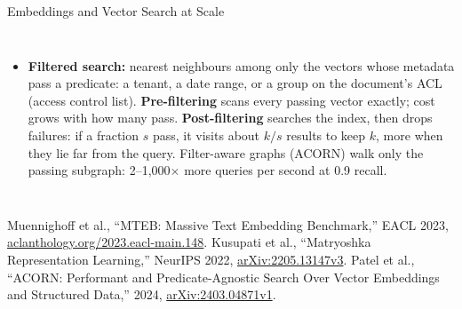 \begin{frame}{Embeddings and Vector Search at Scale}
\begin{columns}[T,onlytextwidth]
      \begin{itemize}\scriptsize
        \item[\textcolor{red}{$\blacktriangleright$}] \textbf{Filtered search:} nearest neighbours among only the vectors whose metadata pass a predicate: a tenant, a date range, or a group on the document's ACL (access control list). \textbf{Pre-filtering} scans every passing vector exactly; cost grows with how many pass. \textbf{Post-filtering} searches the index, then drops failures: if a fraction $s$ pass, it visits about $k/s$ results to keep $k$, more when they lie far from the query. Filter-aware graphs (ACORN) walk only the passing subgraph: 2--1{,}000$\times$ more queries per second at 0.9 recall.
      \end{itemize}
  \end{columns}
  \vspace{0.1em}
  {\scriptsize Muennighoff et al., ``MTEB: Massive Text Embedding Benchmark,'' EACL 2023, \href{https://aclanthology.org/2023.eacl-main.148/}{aclanthology.org/2023.eacl-main.148}. Kusupati et al., ``Matryoshka Representation Learning,'' NeurIPS 2022, \href{https://arxiv.org/abs/2205.13147v3}{arXiv:2205.13147v3}. Patel et al., ``ACORN: Performant and Predicate-Agnostic Search Over Vector Embeddings and Structured Data,'' 2024, \href{https://arxiv.org/abs/2403.04871v1}{arXiv:2403.04871v1}.}
\end{frame}
